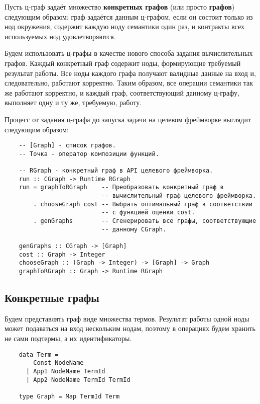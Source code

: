 Пусть ц-граф задаёт множество \textbf{конкретных графов} (или просто \textbf{графов}) следующим образом:
граф задаётся данным ц-графом, если он состоит только из нод окружения, содержит каждую ноду семантики один раз, и контракты всех используемых нод удовлетворяются.

Будем использовать ц-графы в качестве нового способа задания вычислительных графов.
Каждый конкретный граф содержит ноды, формирующие требуемый результат работы.
Все ноды каждого графа получают валидные данные на вход и, следовательно, работают корректно.
Таким образом, все операции семантики так же работают корректно, и каждый граф, соответствующий данному ц-графу, выполняет одну и ту же, требуемую, работу.

Процесс от задания ц-графа до запуска задачи на целевом фреймворке выглядит следующим образом:
\begin{lstlisting}
    -- [Graph] - список графов.
    -- Точка - оператор композиции функций.

    -- RGraph - конкретный граф в API целевого фреймворка.
    run :: CGraph -> Runtime RGraph
    run = graphToRGraph    -- Преобразовать конкретный граф в
                           -- вычислительный граф целевого фреймворка.
        . chooseGraph cost -- Выбрать оптимальный граф в соответствии
                           -- с функцией оценки cost.
        . genGraphs        -- Сгенерировать все графы, соответствующие
                           -- данному CGraph.

    genGraphs :: CGraph -> [Graph]
    cost :: Graph -> Integer
    chooseGraph :: (Graph -> Integer) -> [Graph] -> Graph
    graphToRGraph :: Graph -> Runtime RGraph
\end{lstlisting}


\subsection{Конкретные графы}

Будем представлять граф виде множества термов. Результат работы одной ноды может подаваться на вход нескольким нодам, поэтому в операциях будем хранить не сами подтермы, а их идентификаторы.

\begin{lstlisting}
    data Term =
        Const NodeName
      | App1 NodeName TermId
      | App2 NodeName TermId TermId

    type Graph = Map TermId Term
\end{lstlisting}


